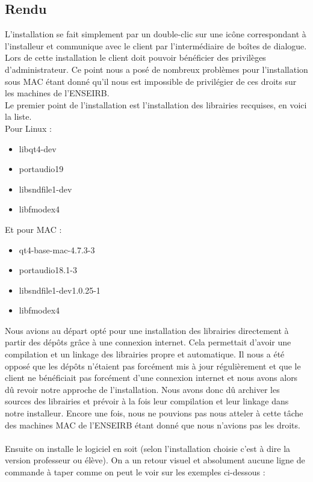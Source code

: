 \documentclass[a4paper,10pt]{article}
\begin{document}
\subsection{Rendu}
L'installation se fait simplement par un double-clic sur une icône correspondant à l'installeur et
communique avec le client par l'intermédiaire de boîtes de dialogue. Lors de cette installation
le client doit pouvoir bénéficier des privilèges d'administrateur. Ce point nous a posé de nombreux
problèmes pour l'installation sous MAC étant donné qu'il nous est impossible de privilégier de ces
droits sur les machines de l'ENSEIRB.\\
Le premier point de l'installation est l'installation des librairies recquises, en voici la liste.\\
Pour Linux :
\begin{itemize}
 \item libqt4-dev
 \item portaudio19
 \item libsndfile1-dev
 \item libfmodex4
\end{itemize}
Et pour MAC :
\begin{itemize}
 \item qt4-base-mac-4.7.3-3
 \item portaudio18.1-3
 \item libsndfile1-dev1.0.25-1
 \item libfmodex4
\end{itemize}
Nous avions au départ opté pour une installation des librairies directement à partir des dépôts grâce
à une connexion internet. Cela permettait d'avoir une compilation et un linkage des librairies propre
et automatique. Il nous a été opposé que les dépôts n'étaient pas forcément mis à jour régulièrement
et que le client ne bénéficiait pas forcément d'une connexion internet et nous avons alors dû revoir
notre approche de l'installation. Nous avons donc dû archiver les sources des librairies et prévoir
à la fois leur compilation et leur linkage dans notre installeur. Encore une fois, nous ne pouvions
pas nous atteler à cette tâche des machines MAC de l'ENSEIRB étant donné que nous n'avions pas les 
droits.\\
\\
Ensuite on installe le logiciel en soit (selon l'installation choisie c'est à dire la version
professeur ou élève). On a un retour visuel et absolument aucune ligne de commande à taper comme
on peut le voir sur les exemples ci-dessous :\\
\end{document}
